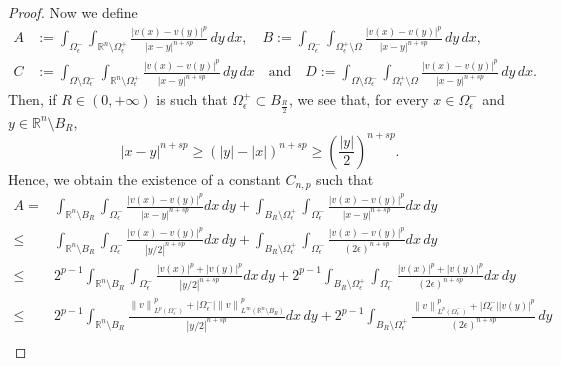 \documentclass[12pt]{article}
\newcommand{\R}{\mathbb{R}}
\numberwithin{equation}{section}
\renewcommand{\leq}{\leqslant}
\renewcommand{\geq}{\geqslant}
\begin{document}
\begin{appendix}
\begin{proof}
Now we define 
\begin{equation*}
\begin{split}
A&:= \int_{\Omega_{\epsilon}^{-}}\int_{\R^n\setminus\Omega_{\epsilon}^{+}} \frac{\left|v(x)-v(y)\right|^p}{\left|x-y\right|^{n+sp}}\,dy\,dx,\quad B:=\int_{\Omega_{\epsilon}^{-}}\int_{\Omega_{\epsilon}^{+}\setminus \Omega} \frac{\left|v(x)-v(y)\right|^p}{\left|x-y\right|^{n+sp}}\,dy\,dx,\\
C&:=\int_{\Omega\setminus \Omega_{\epsilon}^{-}}\int_{\R^n\setminus\Omega_{\epsilon}^{+}} \frac{\left|v(x)-v(y)\right|^p}{\left|x-y\right|^{n+sp}}\,dy\,dx\quad\mbox{and}\quad D:=\int_{\Omega\setminus \Omega_{\epsilon}^{-}}\int_{\Omega_{\epsilon}^{+}\setminus \Omega } \frac{\left|v(x)-v(y)\right|^p}{\left|x-y\right|^{n+sp}}\,dy\,dx.
\end{split}
\end{equation*}
Then, if $R\in (0,+\infty)$ is such that $\Omega_{\epsilon}^{+}\subset B_{\frac{R}{2}}$, we see that, for every $x\in \Omega_{\epsilon}^{-}$ and $y\in \R^n\setminus B_{R}$,
\begin{equation*}
\left|x-y\right|^{n+sp}\geq \left(\left|y\right|-\left|x\right|\right)^{n+sp}\geq \left(\frac{\left|y\right|}{2}\right)^{n+sp}.
\end{equation*} 
Hence, we obtain the existence of a constant $C_{n,p}$ such that
\begin{equation}\label{yecmlap}
\begin{split}
A =&\int_{\R^n\setminus B_{R}}\int_{\Omega_{\epsilon}^{-}}\frac{\left|v(x)-v(y)\right|^p}{\left|x-y\right|^{n+sp}}dx\,dy+\int_{B_{R}\setminus \Omega_{\epsilon}^{+}}\int_{\Omega_{\epsilon}^{-}}\frac{\left|v(x)-v(y)\right|^p}{\left|x-y\right|^{n+sp}}dx\,dy\\
\leq & \int_{\R^n\setminus B_{R}}\int_{\Omega_{\epsilon}^{-}}\frac{\left|v(x)-v(y)\right|^p}{\left|y/2\right|^{n+sp}}dx\,dy+\int_{B_{R}\setminus \Omega_{\epsilon}^{+}}\int_{\Omega_{\epsilon}^{-}}\frac{\left|v(x)-v(y)\right|^p}{(2\epsilon)^{n+sp}}dx\,dy\\
\leq & 2^{p-1}\int_{\R^n\setminus B_{R}}\int_{\Omega_{\epsilon}^{-}}\frac{\left|v(x)\right|^p+\left|v(y)\right|^p}{\left|y/2\right|^{n+sp}}dx\,dy+2^{p-1}\int_{B_{R}\setminus \Omega_{\epsilon}^{+}}\int_{\Omega_{\epsilon}^{-}}\frac{\left|v(x)\right|^p+\left|v(y)\right|^p}{(2\epsilon)^{n+sp}}dx\,dy\\ 
\leq & 2^{p-1}\int_{\R^n\setminus B_{R}}\frac{\left\|v\right\|_{L^p(\Omega_{\epsilon}^-)}^p+\left|\Omega_{\epsilon}^-\right|\left\|v\right\|_{L^\infty(\R^n\setminus B_R)}^p}{\left|y/2\right|^{n+sp}}dx\,dy+2^{p-1}\int_{B_{R}\setminus \Omega_{\epsilon}^{+}}\frac{\left\|v\right\|_{L^p(\Omega_{\epsilon}^-)}^p+\left|\Omega_{\epsilon}^-\right|\left|v(y)\right|^p}{(2\epsilon)^{n+sp}}\,dy\\ 

\end{split}
\end{equation}
\end{proof}
\end{appendix}
\end{document}
